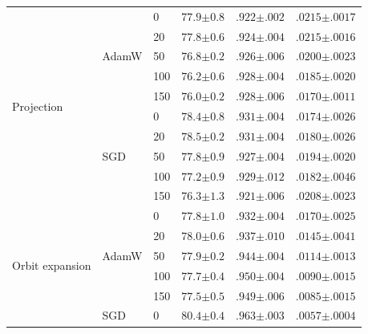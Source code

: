 \documentclass{article}
\begin{document}
\begin{table}[t]
\begin{tabular}{@{}lll ccc@{}}
    \midrule
      \multirow{10}{*}{Projection} & \multirow{5}{*}{AdamW} & 0 & $77.9{\scriptstyle\pm0.8}$ & $.922{\scriptstyle\pm.002}$ & $.0215{\scriptstyle\pm.0017}$ \\
       &  & 20 & $77.8{\scriptstyle\pm0.6}$ & $.924{\scriptstyle\pm.004}$ & $.0215{\scriptstyle\pm.0016}$ \\
       &  & 50 & $76.8{\scriptstyle\pm0.2}$ & $.926{\scriptstyle\pm.006}$ & $.0200{\scriptstyle\pm.0023}$ \\
       &  & 100 & $76.2{\scriptstyle\pm0.6}$ & $.928{\scriptstyle\pm.004}$ & $.0185{\scriptstyle\pm.0020}$ \\
       &  & 150 & $76.0{\scriptstyle\pm0.2}$ & $.928{\scriptstyle\pm.006}$ & $.0170{\scriptstyle\pm.0011}$ \\
    \cmidrule(l){2-6}
       & \multirow{5}{*}{SGD} & 0 & $78.4{\scriptstyle\pm0.8}$ & $.931{\scriptstyle\pm.004}$ & $.0174{\scriptstyle\pm.0026}$ \\
       &  & 20 & $78.5{\scriptstyle\pm0.2}$ & $.931{\scriptstyle\pm.004}$ & $.0180{\scriptstyle\pm.0026}$ \\
       &  & 50 & $77.8{\scriptstyle\pm0.9}$ & $.927{\scriptstyle\pm.004}$ & $.0194{\scriptstyle\pm.0020}$ \\
       &  & 100 & $77.2{\scriptstyle\pm0.9}$ & $.929{\scriptstyle\pm.012}$ & $.0182{\scriptstyle\pm.0046}$ \\
       &  & 150 & $76.3{\scriptstyle\pm1.3}$ & $.921{\scriptstyle\pm.006}$ & $.0208{\scriptstyle\pm.0023}$ \\
    \midrule
      \multirow{10}{*}{Orbit expansion} & \multirow{5}{*}{AdamW} & 0 & $77.8{\scriptstyle\pm1.0}$ & $.932{\scriptstyle\pm.004}$ & $.0170{\scriptstyle\pm.0025}$ \\
       &  & 20 & $78.0{\scriptstyle\pm0.6}$ & $.937{\scriptstyle\pm.010}$ & $.0145{\scriptstyle\pm.0041}$ \\
       &  & 50 & $77.9{\scriptstyle\pm0.2}$ & $.944{\scriptstyle\pm.004}$ & $.0114{\scriptstyle\pm.0013}$ \\
       &  & 100 & $77.7{\scriptstyle\pm0.4}$ & $.950{\scriptstyle\pm.004}$ & $.0090{\scriptstyle\pm.0015}$ \\
       &  & 150 & $77.5{\scriptstyle\pm0.5}$ & $.949{\scriptstyle\pm.006}$ & $.0085{\scriptstyle\pm.0015}$ \\
    \cmidrule(l){2-6}
       & \multirow{5}{*}{SGD} & 0 & $\mathbf{80.4}{\scriptstyle\pm0.4}$ & $.963{\scriptstyle\pm.003}$ & $.0057{\scriptstyle\pm.0004}$ \\

\end{tabular}
\end{table}
\end{document}
